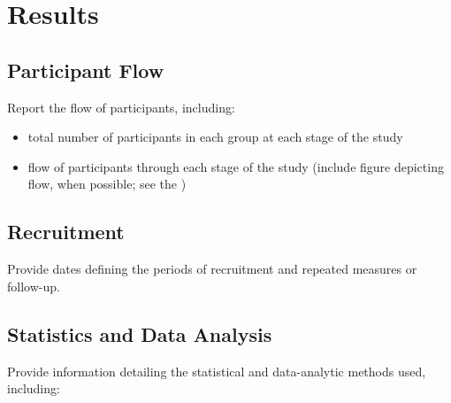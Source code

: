 \documentclass[acmsmall]{acmart}
\begin{document}
\section{Results}

\subsection{Participant Flow}
Report the flow of participants, including:
\begin{itemize}
    \item total number of participants in each group at each stage of the study
    \item flow of participants through each stage of the study (include figure depicting flow, when possible; see the \hyperlink{https://apastyle.apa.org/jars/jars-quant-participant-flowchart.pdf}{\color{blue}{JARS–Quant Participant Flowchart}})
\end{itemize}

\subsection{Recruitment}
Provide dates defining the periods of recruitment and repeated measures or follow-up.

\subsection{ Statistics and Data Analysis}
Provide information detailing the statistical and data-analytic methods used, including:
\end{document}
